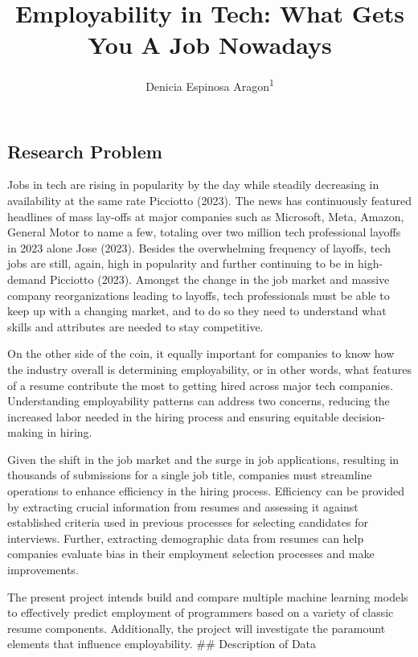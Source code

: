 \documentclass[
  man]{apa6}
\title{Employability in Tech: What Gets You A Job Nowadays}
\author{Denicia Espinosa Aragon\textsuperscript{1}}
\date{}
\affiliation{\vspace{0.5cm}\textsuperscript{1} University of Oregon}
\begin{document}
\maketitle

\hypertarget{research-problem}{%
\subsection{Research Problem}\label{research-problem}}

Jobs in tech are rising in popularity by the day while steadily decreasing in availability at the same rate Picciotto (2023). The news has continuously featured headlines of mass lay-offs at major companies such as Microsoft, Meta, Amazon, General Motor to name a few, totaling over two million tech professional layoffs in 2023 alone Jose (2023). Besides the overwhelming frequency of layoffs, tech jobs are still, again, high in popularity and further continuing to be in high-demand Picciotto (2023). Amongst the change in the job market and massive company reorganizations leading to layoffs, tech professionals must be able to keep up with a changing market, and to do so they need to understand what skills and attributes are needed to stay competitive.

On the other side of the coin, it equally important for companies to know how the industry overall is determining employability, or in other words, what features of a resume contribute the most to getting hired across major tech companies. Understanding employability patterns can address two concerns, reducing the increased labor needed in the hiring process and ensuring equitable decision-making in hiring.

Given the shift in the job market and the surge in job applications, resulting in thousands of submissions for a single job title, companies must streamline operations to enhance efficiency in the hiring process. Efficiency can be provided by extracting crucial information from resumes and assessing it against established criteria used in previous processes for selecting candidates for interviews. Further, extracting demographic data from resumes can help companies evaluate bias in their employment selection processes and make improvements.

The present project intends build and compare multiple machine learning models to effectively predict employment of programmers based on a variety of classic resume components. Additionally, the project will investigate the paramount elements that influence employability.
\#\# Description of Data
\end{document}

